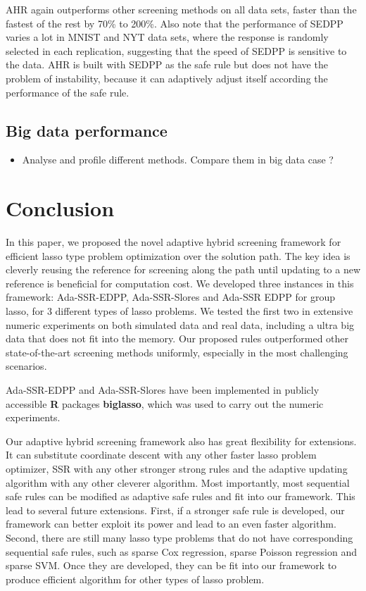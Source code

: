 AHR again outperforms other screening methods on all data sets, faster than the fastest of the rest by 70\% to 200\%. Also note that the performance of SEDPP varies a lot in MNIST and NYT data sets, where the response is randomly selected in each replication, suggesting that the speed of SEDPP is sensitive to the data. AHR is built with SEDPP as the safe rule but does not have the problem of instability, because it can adaptively adjust itself according the performance of the safe rule.



\subsection{Big data performance}

\begin{itemize}
    \item Analyse and profile different methods. Compare them in big data case ?
\end{itemize}

\section{Conclusion}
\label{sec:6}

In this paper, we proposed the novel adaptive hybrid screening framework for efficient lasso type problem optimization over the solution path. The key idea is cleverly reusing the reference for screening along the path until updating to a new reference is beneficial for computation cost.  We developed three instances in this framework: Ada-SSR-EDPP, Ada-SSR-Slores and Ada-SSR EDPP for group lasso, for 3 different types of lasso problems. We tested the first two in extensive numeric experiments on both simulated data and real data, including a ultra big data that does not fit into the memory. Our proposed rules outperformed other state-of-the-art screening methods uniformly, especially in the most challenging scenarios. 

Ada-SSR-EDPP and Ada-SSR-Slores have been implemented in  publicly accessible \textbf{R} packages \textbf{biglasso}\citep{zeng2017biglasso}, which was used to carry out the numeric experiments.

Our adaptive hybrid screening framework also has great flexibility for extensions. It can substitute coordinate descent with any other faster lasso problem optimizer, SSR with any other stronger strong rules and the adaptive updating algorithm with any other cleverer algorithm. Most importantly, most sequential safe rules can be modified as adaptive safe rules and fit into our framework. This lead to several future extensions. First, if a stronger safe rule is developed, our framework can better exploit its power and lead to an even faster algorithm. Second, there are still many lasso type problems that do not have corresponding sequential safe rules, such as sparse Cox regression, sparse Poisson regression and sparse SVM. Once they are developed, they can be fit into our framework to produce efficient algorithm for other types of lasso problem.



